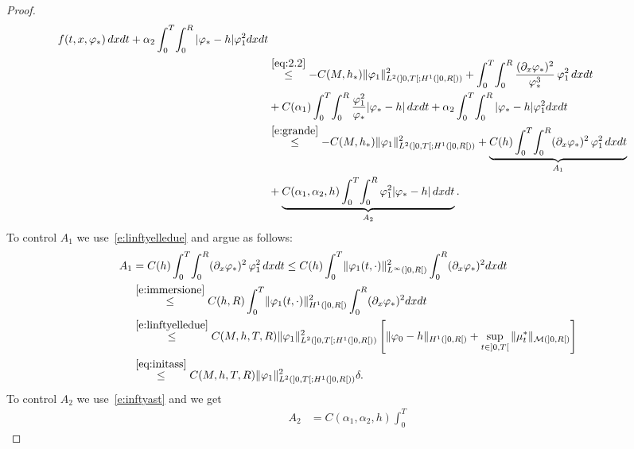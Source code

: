 \documentclass[11pt,leqno]{amsart}
\numberwithin{equation}{section}
\begin{document}
\begin{proof}
\begin{equation}
\begin{split}
    f(t, x, {\varphi}_\ast) \, dx dt + \alpha_2 \int_0^T \!  \int_0^R
    |{\varphi}_\ast - h |{\varphi}_1^2 dx dt 
    \\
    &
    \stackrel{\eqref{eq:2.2}}{\leq} - C(M, h_\ast) \| {\varphi}_1 \|^2_{L^2
      ( ]0, T[; H^1 (]0, R[))} + \int_0^T \!  \int_0^R \frac{( {\partial_x }
      {\varphi}_\ast)^2 }{{\varphi}^3_\ast} \, {\varphi}_1^2 \, dx dt 
    \\
    &+ C(
    \alpha_1) \int_0^T \!  \int_0^R \frac{{\varphi}_1^2}{{\varphi}_\ast}
    |{\varphi}_\ast - h| \, dx dt + \alpha_2 \int_0^T \!  \int_0^R
    |{\varphi}_\ast - h |{\varphi}_1^2
    dx dt 
    \\
    & \stackrel{\eqref{e:grande}}{\leq} - C(M, h_\ast) \| {\varphi}_1
    \|^2_{L^2 ( ]0, T[; H^1 (]0, R[))} + \underbrace{C(h) \int_0^T \!
      \int_0^R ( {\partial_x } {\varphi}_\ast)^2 \, {\varphi}_1^2 \, dx dt}_{A_1}
    \\
    &+
    \underbrace{C(\alpha_1, \alpha_2, h ) \int_0^T \!  \int_0^R
      {\varphi}_1^2 |{\varphi}_\ast - h| \, dx dt}_{A_2}.
  \end{split}
\end{equation}
To control $A_1$ we use~\eqref{e:linftyelledue} and argue as follows:
\begin{equation}
\label{e:auno}
\begin{split}
 A_1 & = C(h) \int_0^T \!
\int_0^R   ( {\partial_x } {\varphi}_\ast)^2  \, {\varphi}_1^2 \, dx dt
\leq C(h)  \int_0^T \! \| {\varphi}_1 (t, \cdot) \|^2_{L^\infty (]0, R[)}
\int_0^R   ( {\partial_x } {\varphi}_\ast)^2  dx dt \\ &
\stackrel{\eqref{e:immersione}}{\leq}
C(h, R)  \int_0^T \! \| {\varphi}_1 (t, \cdot) \|^2_{H^1 (]0, R[)}
\int_0^R   ( {\partial_x } {\varphi}_\ast)^2  dx dt \\ &
 \stackrel{\eqref{e:linftyelledue}}{\leq}
 C(M,h, T, R) \| {\varphi}_1 \|^2_{L^2 (  ]0, T[; H^1 (]0, R[))}
 \left[ 
     \| {\varphi}_0 - h \|_{H^1 (]0, R[)}+
     \sup_{t \in ]0, T[} 
     \| \mu_t^\ast \|_{\mathcal M (]0, R[)}  \right]  \\
     & \stackrel{\eqref{eq:initass}}{\leq}
     C(M,h, T, R) \| {\varphi}_1 \|^2_{L^2 (  ]0, T[; H^1 (]0, R[))} \delta. 
\end{split}
\end{equation}
To control $A_2$ we use~\eqref{e:inftyast} and we get 
\begin{equation}
\label{e:adue}
\begin{split}
  A_2 & =        C(\alpha_1, \alpha_2, h  )
  \int_0^T \!

\end{split}
\end{equation}
\end{proof}
\end{document}
